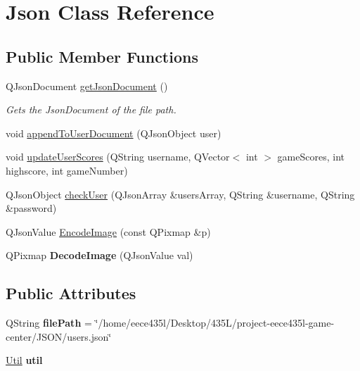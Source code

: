 \hypertarget{classJson}{\section{Json Class Reference}
\label{classJson}
}
\subsection*{Public Member Functions}
\begin{DoxyCompactItemize}
\item 
Q\-Json\-Document \hyperlink{classJson_a8f60a3a23f11ac93003d1c3e0e069dde}{get\-Json\-Document} ()
\begin{DoxyCompactList}\small\item\em Gets the Json\-Document of the file path. \end{DoxyCompactList}\item 
void \hyperlink{classJson_afe466a1ce0a4f747a366029db26ee9a3}{append\-To\-User\-Document} (Q\-Json\-Object user)
\item 
void \hyperlink{classJson_a21ad90aadf8443aab3f4a60288ee100a}{update\-User\-Scores} (Q\-String username, Q\-Vector$<$ int $>$ game\-Scores, int highscore, int game\-Number)
\item 
Q\-Json\-Object \hyperlink{classJson_a515ca3c26feb507e7da11cdf61ec77cd}{check\-User} (Q\-Json\-Array \&users\-Array, Q\-String \&username, Q\-String \&password)
\item 
Q\-Json\-Value \hyperlink{classJson_a89ce8478fc9da72e964e6aef97604ae3}{Encode\-Image} (const Q\-Pixmap \&p)
\item 
\hypertarget{classJson_a2586512a930bc5631183cf2b722e91eb}{Q\-Pixmap {\bfseries Decode\-Image} (Q\-Json\-Value val)}\label{classJson_a2586512a930bc5631183cf2b722e91eb}

\end{DoxyCompactItemize}
\subsection*{Public Attributes}
\begin{DoxyCompactItemize}
\item 
\hypertarget{classJson_ad637dea3aa5aa005b0b21af4bbc59328}{Q\-String {\bfseries file\-Path} = \char`\"{}/home/eece435l/Desktop/435\-L/project-\/eece435l-\/game-\/center/\-J\-S\-O\-N/users.\-json\char`\"{}}\label{classJson_ad637dea3aa5aa005b0b21af4bbc59328}

\item 
\hypertarget{classJson_ac414a8d0e58941fbe840808c32fb1879}{\hyperlink{classUtil}{Util} {\bfseries util}}\label{classJson_ac414a8d0e58941fbe840808c32fb1879}

\end{DoxyCompactItemize}


